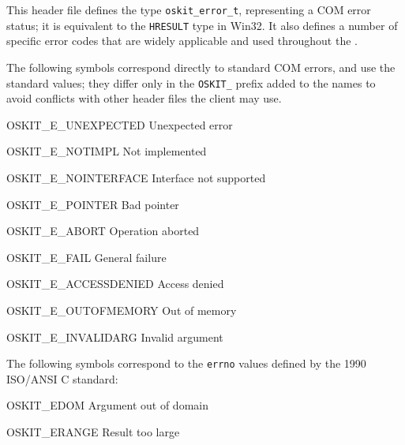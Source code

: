 \label{oskit-error-h}
\begin{apidesc}
	This header file defines
	the type \texttt{oskit_error_t},
	representing a COM error status;
	it is equivalent to the \texttt{HRESULT} type in Win32.
	It also defines a number of specific error codes
	that are widely applicable and used throughout the \oskit{}.

	The following symbols correspond directly to standard COM errors,
	and use the standard values;
	they differ only in the \texttt{OSKIT_} prefix added to the names
	to avoid conflicts with other header files the client may use.
	\begin{icsymlist}
	\item[OSKIT_E_UNEXPECTED]	Unexpected error
	\item[OSKIT_E_NOTIMPL]		Not implemented
	\item[OSKIT_E_NOINTERFACE]	Interface not supported
	\item[OSKIT_E_POINTER]		Bad pointer
	\item[OSKIT_E_ABORT]		Operation aborted
	\item[OSKIT_E_FAIL]		General failure
	\item[OSKIT_E_ACCESSDENIED]	Access denied
	\item[OSKIT_E_OUTOFMEMORY]	Out of memory
	\item[OSKIT_E_INVALIDARG]	Invalid argument
	\end{icsymlist}

	The following symbols correspond to the \texttt{errno} values
	defined by the 1990 ISO/ANSI C standard:
	\begin{icsymlist}
	\item[OSKIT_EDOM]		Argument out of domain
	\item[OSKIT_ERANGE]		Result too large
	\end{icsymlist}


\end{apidesc}

